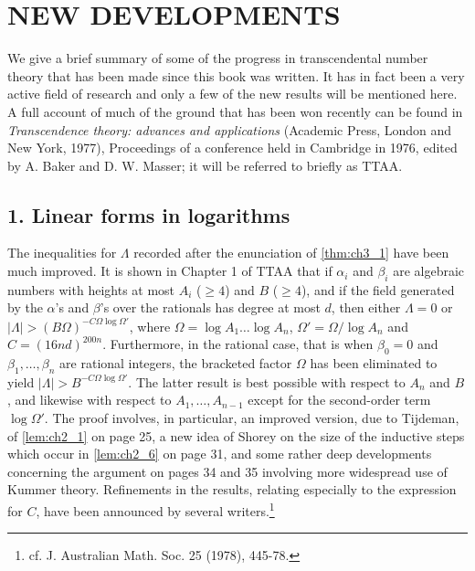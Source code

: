 \chapter*{NEW DEVELOPMENTS}

We give a brief summary of some of the progress in transcendental number theory that has been made since this book was written. It has in fact been a very active field of research and only a few of the new results will be mentioned here. A full account of much of the ground that has been won recently can be found in \textit{Transcendence theory: advances and applications} (Academic Press, London and New York, 1977), Proceedings of a conference held in Cambridge in 1976, edited by A. Baker and D. W. Masser; it will be referred to briefly as TTAA.

\section*{1. Linear forms in logarithms}

The inequalities for \(\Lambda\) recorded after the enunciation of \autoref{thm:ch3_1} have been much improved. It is shown in Chapter 1 of TTAA that if \(\alpha_i\) and \(\beta_i\) are algebraic numbers with heights at most \(A_i\) (\(\ge 4\)) and \(B\) (\(\ge 4\)), and if the field generated by the \(\alpha\)'s and \(\beta\)'s over the rationals has degree at most \(d\), then either \(\Lambda = 0\) or \(|\Lambda| > (B\Omega)^{-C\Omega \log \Omega'}\), where \(\Omega = \log A_1 \dots \log A_n\), \(\Omega' = \Omega/\log A_n\) and \(C = (16nd)^{200n}\). Furthermore, in the rational case, that is when \(\beta_0 = 0\) and \(\beta_1, \dots, \beta_n\) are rational integers, the bracketed factor \(\Omega\) has been eliminated to yield \(|\Lambda| > B^{-C\Omega \log \Omega'}\). The latter result is best possible with respect to \(A_n\) and \(B\), and likewise with respect to \(A_1, \dots, A_{n-1}\) except for the second-order term \(\log \Omega'\). The proof involves, in particular, an improved version, due to Tijdeman, of \autoref{lem:ch2_1} on page 25, a new idea of Shorey on the size of the inductive steps which occur in \autoref{lem:ch2_6} on page 31, and some rather deep developments concerning the argument on pages 34 and 35 involving more widespread use of Kummer theory. Refinements in the results, relating especially to the expression for \(C\), have been announced by several writers.\footnote{cf. J. Australian Math. Soc. 25 (1978), 445-78.}

